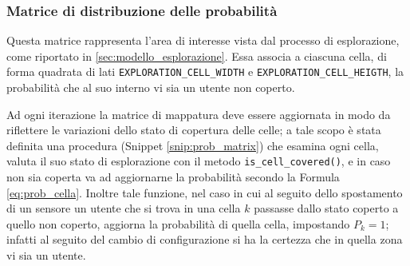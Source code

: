 \subsubsection{Matrice di distribuzione delle probabilità} \label{subsec:mappa_prob}
Questa matrice rappresenta l'area di interesse vista dal processo di esplorazione, come riportato in \ref{sec:modello_esplorazione}.
Essa associa a ciascuna cella, di forma quadrata di lati \texttt{EXPLORATION\_CELL\_WIDTH} e \texttt{EXPLORATION\_CELL\_HEIGTH}, la probabilità che al suo interno vi sia un utente non coperto.

Ad ogni iterazione la matrice di mappatura deve essere aggiornata in modo da riflettere le variazioni dello stato di copertura delle celle; a tale scopo è stata definita una procedura (Snippet \ref{snip:prob_matrix}) che esamina ogni cella, valuta il suo stato di esplorazione con il metodo \texttt{is\_cell\_covered()}, e in caso non sia coperta va ad aggiornarne la probabilità secondo la Formula \ref{eq:prob_cella}.
Inoltre tale funzione, nel caso in cui al seguito dello spostamento di un sensore un utente che si trova in una cella $k$ passasse dallo stato coperto a quello non coperto, aggiorna la probabilità di quella cella, impostando $P_k=1$; infatti al seguito del cambio di configurazione si ha la certezza che in quella zona vi sia un utente.
